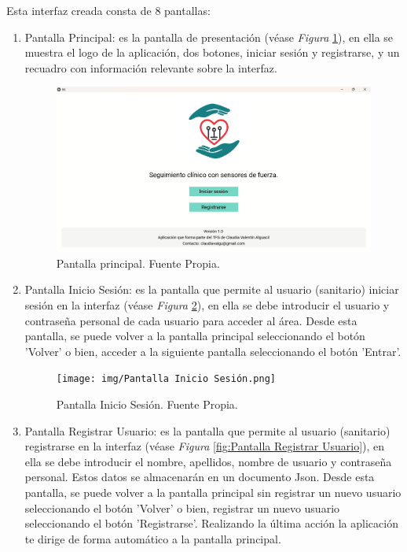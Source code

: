 Esta interfaz creada consta de 8 pantallas:
\begin{enumerate}
    \item Pantalla Principal: es la pantalla de presentación (véase \textit{Figura} \ref{fig:Pantalla principal}), en ella se muestra el logo de la aplicación, dos botones, iniciar sesión y registrarse, y un recuadro con información relevante sobre la interfaz.
    \begin{figure}
        \centering
        \includegraphics[width=1\linewidth]{img/Pantalla principal.png}
        \caption{Pantalla principal. Fuente Propia.}
        \label{fig:Pantalla principal}
    \end{figure}
    \item Pantalla Inicio Sesión: es la pantalla que permite al usuario (sanitario) iniciar sesión en la interfaz (véase \textit{Figura} \ref{fig:Pantalla Inicio Sesión}), en ella se debe introducir el usuario y contraseña personal de cada usuario para acceder al área. Desde esta pantalla, se puede volver a la pantalla principal seleccionando el botón 'Volver' o bien, acceder a la siguiente pantalla seleccionando el botón 'Entrar'.
\begin{figure}
    \centering
    \texttt{[image: img/Pantalla Inicio Sesión.png]}
    \caption{Pantalla Inicio Sesión. Fuente Propia.}
    \label{fig:Pantalla Inicio Sesión}
\end{figure}
    \item Pantalla Registrar Usuario: es la pantalla que permite al usuario (sanitario) registrarse en la interfaz (véase \textit{Figura} \ref{fig:Pantalla Registrar Usuario}), en ella se debe introducir el nombre, apellidos, nombre de usuario y contraseña personal. Estos datos se almacenarán en un documento Json. Desde esta pantalla, se puede volver a la pantalla principal sin registrar un nuevo usuario seleccionando el botón 'Volver' o bien, registrar un nuevo usuario seleccionando el botón 'Registrarse'. Realizando la última acción la aplicación te dirige de forma automático a la pantalla principal.

\end{enumerate}

